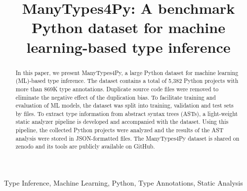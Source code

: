 \documentclass[10pt, conference]{IEEEtran}
\begin{document}
\title{ManyTypes4Py: A benchmark Python dataset for machine learning-based type inference\\
}

\author{
\and
{}
\and
{}
}

\maketitle

\begin{abstract}
In this paper, we present ManyTypes4Py, a large Python dataset for machine learning (ML)-based type inference. The dataset contains a total of 5,382 Python projects with more than 869K type annotations. Duplicate source code files were removed to eliminate the negative effect of the duplication bias. To facilitate training and evaluation of ML models, the dataset was split into training, validation and test sets by files. To extract type information from abstract syntax trees (ASTs), a light-weight static analyzer pipeline is developed and accompanied with the dataset. Using this pipeline, the collected Python projects were analyzed and the results of the AST analysis were stored in JSON-formatted files. The ManyTypes4Py dataset is shared on zenodo and its tools are publicly available on GitHub.
\end{abstract}

\begin{IEEEkeywords}
Type Inference, Machine Learning, Python, Type Annotations, Static Analysis
\end{IEEEkeywords}
\end{document}
